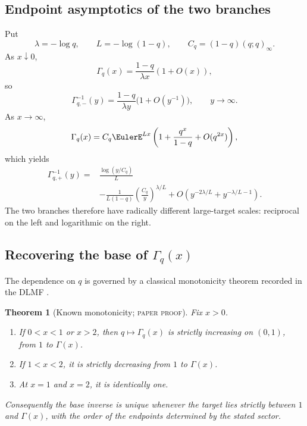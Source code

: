 \documentclass[11pt,oneside]{article}
\newtheorem{theorem}{Theorem}[section]
\theoremstyle{definition}
\theoremstyle{remark}
\theoremstyle{plain}
\theoremstyle{definition}
\theoremstyle{remark}
\newcommand{\statusproved}{\textcolor{provedgreen}{\textsc{paper proof}}}
\numberwithin{equation}{section}
\numberwithin{figure}{section}
\numberwithin{table}{section}
\let\reportsubsection\subsection
\let\reportsubsubsection\subsubsection
\let\section\reportsubsection
\let\subsection\reportsubsubsection
\begin{document}
\section{Endpoint asymptotics of the two branches}
Put
\[
 \lambda=-\log q,
 \qquad
 L=-\log(1-q),
 \qquad
 C_q=(1-q)(q;q)_\infty.
\]
As \(x\downarrow0\),
\[
 \Gamma_q(x)=\frac{1-q}{\lambda x}(1+O(x)),
\]
so
\begin{equation}
 \Gamma_{q,-}^{-1}(y)
 =\frac{1-q}{\lambda y}\bigl(1+O(y^{-1})\bigr),
 \qquad y\to\infty.
 \label{eq:qgamma-lower-large}
\end{equation}
As \(x\to\infty\),
\[
 \Gamma_q(x)=C_q\EulerE^{Lx}
 \left(1+\frac{q^x}{1-q}+O(q^{2x})\right),
\]
which yields
\begin{equation}
\begin{split}
 \Gamma_{q,+}^{-1}(y)
 ={}&\frac{\log(y/C_q)}{L}\\
 &-\frac{1}{L(1-q)}
 \left(\frac{C_q}{y}\right)^{\lambda/L}
 +O\!\left(y^{-2\lambda/L}+y^{-\lambda/L-1}\right).
\end{split}
\label{eq:qgamma-upper-large}
\end{equation}
The two branches therefore have radically different large-target scales:
reciprocal on the left and logarithmic on the right.

\section{Recovering the base of \texorpdfstring{\(\Gamma_q(x)\)}{Gamma-q(x)}}
The dependence on \(q\) is governed by a classical monotonicity theorem
recorded in the DLMF \cite{DLMFqGamma}.

\begin{theorem}[Known monotonicity; \statusproved]
Fix \(x>0\).
\begin{enumerate}[label=(\roman*)]
\item If \(0<x<1\) or \(x>2\), then \(q\mapsto\Gamma_q(x)\) is strictly
increasing on \((0,1)\), from \(1\) to \(\Gamma(x)\).
\item If \(1<x<2\), it is strictly decreasing from \(1\) to \(\Gamma(x)\).
\item At \(x=1\) and \(x=2\), it is identically one.
\end{enumerate}
Consequently the base inverse is unique whenever the target lies strictly
between \(1\) and \(\Gamma(x)\), with the order of the endpoints determined by
the stated sector.
\end{theorem}
\end{document}
